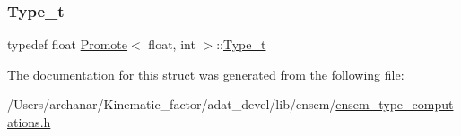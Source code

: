 \subsubsection{\texorpdfstring{Type\_t}{Type\_t}\hspace{0.1cm}{\footnotesize\ttfamily [2/2]}}
{\footnotesize\ttfamily typedef float \mbox{\hyperlink{structPromote}{Promote}}$<$ float, int $>$\+::\mbox{\hyperlink{structPromote_3_01float_00_01int_01_4_a8df52b198586e88fc51366c1f8774543}{Type\+\_\+t}}}



The documentation for this struct was generated from the following file\+:\begin{DoxyCompactItemize}
\item 
/\+Users/archanar/\+Kinematic\+\_\+factor/adat\+\_\+devel/lib/ensem/\mbox{\hyperlink{lib_2ensem_2ensem__type__computations_8h}{ensem\+\_\+type\+\_\+computations.\+h}}\end{DoxyCompactItemize}
